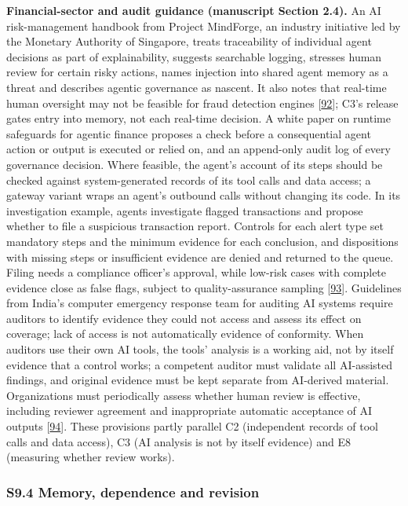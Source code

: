 \documentclass[
  11pt,
]{article}
\begin{document}
\textbf{Financial-sector and audit guidance (manuscript Section 2.4).}
An AI risk-management handbook from Project MindForge, an industry
initiative led by the Monetary Authority of Singapore, treats
traceability of individual agent decisions as part of explainability,
suggests searchable logging, stresses human review for certain risky
actions, names injection into shared agent memory as a threat and
describes agentic governance as nascent. It also notes that real-time
human oversight may not be feasible for fraud detection engines
{[}\protect\hyperlink{ref-MindForge2026Operationalisation}{92}{]}; C3's
release gates entry into memory, not each real-time decision. A white
paper on runtime safeguards for agentic finance proposes a check before
a consequential agent action or output is executed or relied on, and an
append-only audit log of every governance decision. Where feasible, the
agent's account of its steps should be checked against system-generated
records of its tool calls and data access; a gateway variant wraps an
agent's outbound calls without changing its code. In its investigation
example, agents investigate flagged transactions and propose whether to
file a suspicious transaction report. Controls for each alert type set
mandatory steps and the minimum evidence for each conclusion, and
dispositions with missing steps or insufficient evidence are denied and
returned to the queue. Filing needs a compliance officer's approval,
while low-risk cases with complete evidence close as false flags,
subject to quality-assurance sampling
{[}\protect\hyperlink{ref-MAS2026SAFR}{93}{]}. Guidelines from India's
computer emergency response team for auditing AI systems require
auditors to identify evidence they could not access and assess its
effect on coverage; lack of access is not automatically evidence of
conformity. When auditors use their own AI tools, the tools' analysis is
a working aid, not by itself evidence that a control works; a competent
auditor must validate all AI-assisted findings, and original evidence
must be kept separate from AI-derived material. Organizations must
periodically assess whether human review is effective, including
reviewer agreement and inappropriate automatic acceptance of AI outputs
{[}\protect\hyperlink{ref-CERTIn2026AIAudit}{94}{]}. These provisions
partly parallel C2 (independent records of tool calls and data access),
C3 (AI analysis is not by itself evidence) and E8 (measuring whether
review works).

\hypertarget{s9.4-memory-dependence-and-revision}{%
\subsubsection{S9.4 Memory, dependence and
revision}\label{s9.4-memory-dependence-and-revision}}
\end{document}
